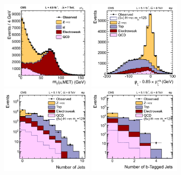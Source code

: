 \documentclass[12pt,twoside,a4paper,cmspaper,final,collab]{cms-tdr}
\begin{document}
\begin{figure}[t!]
\begin{center}
\includegraphics[width=0.4\textwidth]{figures/htt/2011_muTau_mt_fix.pdf}
\includegraphics[width=0.4\textwidth]{figures/htt/pzetavar_fix.pdf} \\
\includegraphics[width=0.4\textwidth]{figures/htt/nalljets_log_fix.pdf}
\includegraphics[width=0.4\textwidth]{figures/htt/nbjets_log_fix.pdf} \\
\end{center}

\end{figure}
\end{document}
